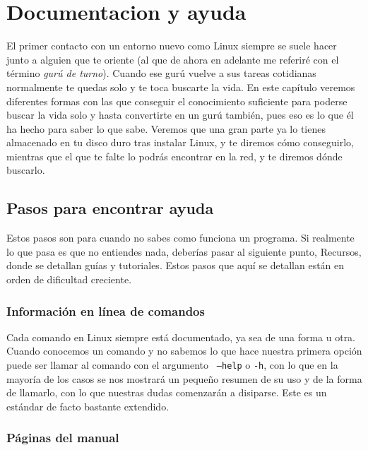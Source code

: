 
\chapter{Documentacion y ayuda}
\label{documentacion.tex}
\label{documentacion}

El primer  contacto con un entorno  nuevo como Linux siempre  se suele
hacer junto a alguien  que te oriente (al que de  ahora en adelante me
referiré con el término {\em gurú de turno}). Cuando ese gurú vuelve a
sus tareas cotidianas normalmente te quedas solo y te toca buscarte la
vida. En este capítulo veremos diferentes formas con las que conseguir
el conocimiento  suficiente para poderse  buscar la vida solo  y hasta
convertirte en un  gurú también, pues eso  es lo que él  ha hecho para
saber lo que sabe. Veremos que  una gran parte ya lo tienes almacenado
en tu disco  duro tras instalar Linux, y te  diremos cómo conseguirlo,
mientras que  el que  te falte  lo podrás  encontrar en  la red,  y te
diremos dónde buscarlo.

\section{Pasos para encontrar ayuda}

Estos pasos  son para cuando  no sabes  como funciona un  programa. Si
realmente lo  que pasa  es que  no entiendes  nada, deberías  pasar al
siguiente punto, Recursos, donde se detallan guías y tutoriales. Estos
pasos que aquí se detallan están en orden de dificultad creciente.

\subsection{Información en línea de comandos}

Cada comando en Linux siempre está  documentado, ya sea de una forma u
otra. Cuando  conocemos un comando  y no  sabemos lo que  hace nuestra
primera  opción puede  ser llamar  al  comando con  el argumento  {\tt
--help} o  {\tt -h},  con lo  que en la  mayoría de  los casos  se nos
mostrará un pequeño resumen  de su uso y de la  forma de llamarlo, con
lo que nuestras  dudas comenzarán a disiparse. Este es  un estándar de
facto bastante extendido.

\subsection{Páginas del manual}

